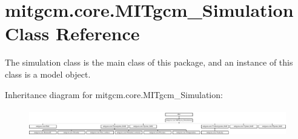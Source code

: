 \hypertarget{classmitgcm_1_1core_1_1MITgcm__Simulation}{\section{mitgcm.\+core.\+M\+I\+Tgcm\+\_\+\+Simulation Class Reference}
\label{classmitgcm_1_1core_1_1MITgcm__Simulation}
}


The simulation class is the main class of this package, and an instance of this class is a model object.  


Inheritance diagram for mitgcm.\+core.\+M\+I\+Tgcm\+\_\+\+Simulation\+:\begin{figure}[H]
\begin{center}
\leavevmode
\includegraphics[height=1.244444cm]{classmitgcm_1_1core_1_1MITgcm__Simulation}
\end{center}
\end{figure}
